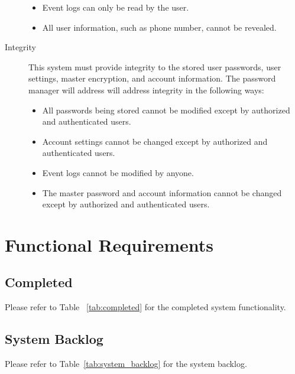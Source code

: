 \documentclass{article}
\begin{document}
\begin{description}
\begin{itemize}
    \item Event logs can only be read by the user.
    \item All user information, such as phone number, cannot be revealed.
\end{itemize}
  \item[Integrity] This system must provide integrity to the stored user passwords, user settings, master encryption, and account information. The password manager will address will address integrity in the following ways:
    \begin{itemize}
      \item All passwords being stored cannot be modified except by authorized and authenticated users.
      \item Account settings cannot be changed except by authorized and authenticated users.
      \item Event logs cannot be modified by anyone.
      \item The master password and account information cannot be changed except by authorized and authenticated users.
    \end{itemize}
\end{description}

\section{Functional Requirements}
\label{sec:functional_requirements}

\subsection{Completed}
\label{sub:completed}
Please refer to Table ~\ref{tab:completed} for the completed system functionality.

\subsection{System Backlog}
\label{sub:system_backlog}
Please refer to Table~\ref{tab:system_backlog} for the system backlog.
\end{document}

